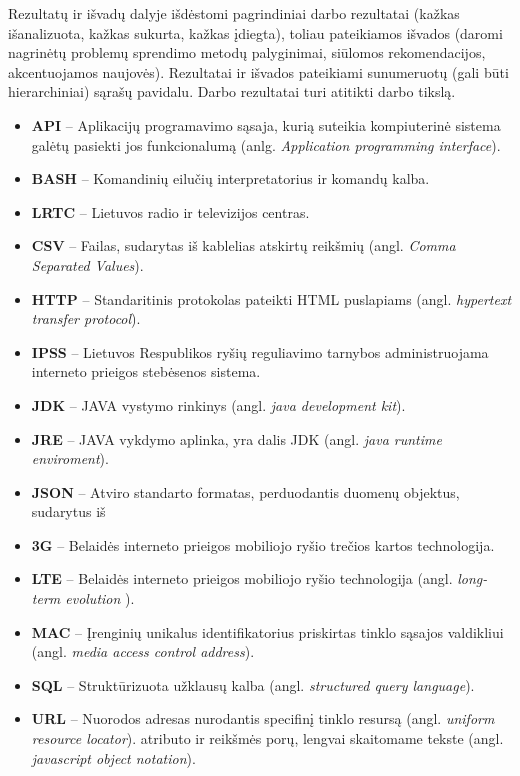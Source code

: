 \documentclass{VUMIFPSbakalaurinis}
\begin{document}








Rezultatų ir išvadų dalyje išdėstomi pagrindiniai darbo rezultatai (kažkas
išanalizuota, kažkas sukurta, kažkas įdiegta), toliau pateikiamos išvados
(daromi nagrinėtų problemų sprendimo metodų palyginimai, siūlomos
rekomendacijos, akcentuojamos naujovės). Rezultatai ir išvados pateikiami
sunumeruotų (gali būti hierarchiniai) sąrašų pavidalu. Darbo rezultatai turi
atitikti darbo tikslą.

\printbibliography[heading=bibintoc]
\begin{itemize}
	\item \textbf{API} – Aplikacijų programavimo sąsaja, kurią suteikia kompiuterinė sistema galėtų pasiekti jos funkcionalumą (anlg. \textit{Application programming interface}).
	\item \textbf{BASH} – Komandinių eilučių interpretatorius ir komandų kalba.
	\item \textbf{LRTC} – Lietuvos radio ir televizijos centras.
	\item \textbf{CSV} – Failas, sudarytas iš kablelias atskirtų reikšmių (angl.\textit{ Comma Separated Values}).
	\item \textbf{HTTP} – Standaritinis protokolas pateikti HTML puslapiams (angl. \textit{hypertext transfer protocol}).
	\item \textbf{IPSS} – Lietuvos Respublikos ryšių reguliavimo tarnybos administruojama interneto prieigos stebėsenos sistema.
	\item \textbf{JDK} – JAVA vystymo rinkinys (angl. \textit{java development kit}).
	\item \textbf{JRE} – JAVA vykdymo aplinka, yra dalis JDK (angl. \textit{java runtime enviroment}).
	\item \textbf{JSON} – Atviro standarto formatas, perduodantis duomenų objektus, sudarytus iš
	\item \textbf{3G} – Belaidės interneto prieigos mobiliojo ryšio trečios kartos technologija.
	\item \textbf{LTE} – Belaidės interneto prieigos mobiliojo ryšio technologija (angl. \textit{long-term evolution }).
	\item \textbf{MAC} – Įrenginių unikalus identifikatorius priskirtas tinklo sąsajos valdikliui (angl. \textit{media access control address}).
	\item \textbf{SQL} – Struktūrizuota užklausų kalba (angl. \textit{structured query language}).
	\item \textbf{URL} – Nuorodos adresas nurodantis specifinį tinklo resursą (angl. \textit{uniform resource locator}). atributo ir reikšmės porų, lengvai skaitomame tekste (angl. \textit{javascript object notation}).
\end{itemize}
\end{document}
